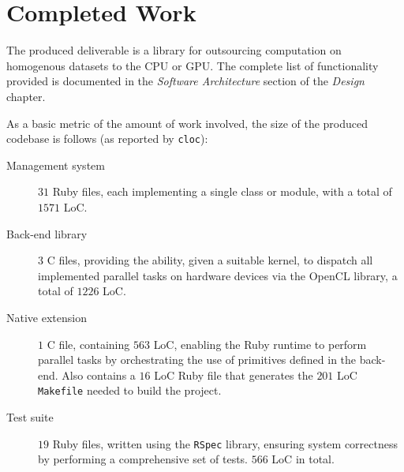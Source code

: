 \section{Completed Work}
The produced deliverable is a library for outsourcing computation on homogenous datasets to the \ac{CPU} or \ac{GPU}. The complete list of functionality provided is documented in the \emph{Software Architecture} section of the \emph{Design} chapter.

As a basic metric of the amount of work involved, the size of the produced codebase is follows (as reported by \verb|cloc|):

\begin{description}
  \item[Management system] $31$ Ruby files, each implementing a single class or module, with a total of $1571$ \ac{LoC}.

  \item[Back-end library] $3$ C files, providing the ability, given a suitable kernel, to dispatch all implemented parallel tasks on hardware devices via the \ac{OpenCL} library, a total of $1226$ \ac{LoC}.

  \item[Native extension] $1$ C file, containing $563$ \ac{LoC}, enabling the Ruby runtime to perform parallel tasks by orchestrating the use of primitives defined in the back-end. Also contains a $16$ \ac{LoC} Ruby file that generates the $201$ \ac{LoC} \verb|Makefile| needed to build the project.

  \item[Test suite] $19$ Ruby files, written using the \verb|RSpec| library, ensuring system correctness by performing a comprehensive set of tests. $566$ \ac{LoC} in total.
  \end{description}
